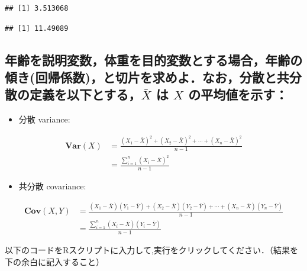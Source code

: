 \documentclass[11pt,]{problemset}
\newenvironment{Shaded}{\begin{snugshade}}{\end{snugshade}}
\newcommand{\CommentTok}[1]{\textcolor[rgb]{0.56,0.35,0.01}{\textit{#1}}}
\newcommand{\KeywordTok}[1]{\textcolor[rgb]{0.13,0.29,0.53}{\textbf{#1}}}
\newcommand{\NormalTok}[1]{#1}
\newcommand{\OperatorTok}[1]{\textcolor[rgb]{0.81,0.36,0.00}{\textbf{#1}}}
\providecommand{\tightlist}{%
  \setlength{\itemsep}{0pt}\setlength{\parskip}{0pt}}
\begin{document}
\begin{verbatim}
## [1] 3.513068
\end{verbatim}

\begin{Shaded}
\end{Shaded}

\begin{verbatim}
## [1] 11.49089
\end{verbatim}

\hypertarget{barx--x-}{%
\subsection{\texorpdfstring{年齢を説明変数，体重を目的変数とする場合，年齢の傾き(回帰係数)，と切片を求めよ．なお，分散と共分散の定義を以下とする，\(\bar{X}\)
は \(X\)
の平均値を示す：}{年齢を説明変数，体重を目的変数とする場合，年齢の傾き(回帰係数)，と切片を求めよ．なお，分散と共分散の定義を以下とする，\textbackslash{}bar\{X\} は X の平均値を示す：}}\label{barx--x-}}

\begin{itemize}
\tightlist
\item
  分散 variance:
\end{itemize}

\[
\begin{aligned}
\mathbf{Var}(X) & = \frac{(X_1-\bar{X})^2+(X_2-\bar{X})^2+\cdots+(X_n-\bar{X})^2}{n - 1} \\
                & = \frac{\sum_{i=1}^n(X_i-\bar{X})^2}{n -1}
\end{aligned}
\]

\begin{itemize}
\tightlist
\item
  共分散 covariance:
\end{itemize}

\[
\begin{aligned}
\mathbf{Cov}(X, Y) & = \frac{(X_1 - \bar{X})(Y_1-\bar{Y}) + (X_2 - \bar{X})(Y_2-\bar{Y}) + \cdots + (X_n - \bar{X})(Y_n-\bar{Y})}{n - 1} \\
                   & = \frac{\sum_{i = 1}^n(X_i - \bar{X})(Y_i-\bar{Y})}{n - 1}
\end{aligned}
\]

以下のコードをRスクリプトに入力して,実行をクリックしてください．（結果を下の余白に記入すること）
\end{document}
